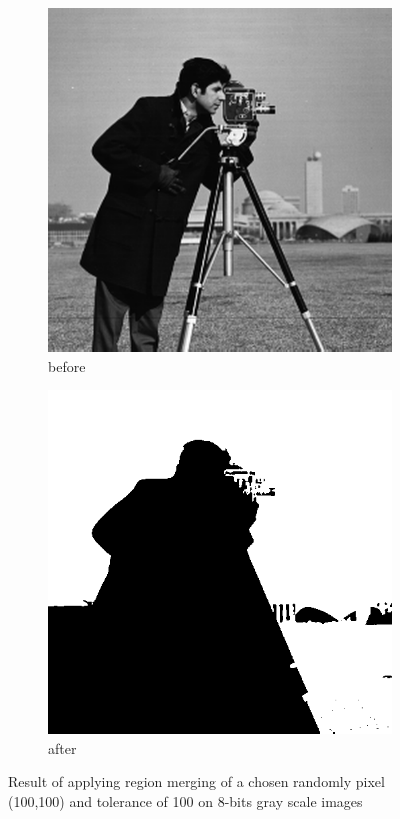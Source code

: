 \documentclass[12pt]{article}
\renewcommand{\subfiguresize}{.25\textwidth}
\begin{document}
\begin{figure}[H]
    \begin{subfigure}[t]{\subfiguresize}
        \includegraphics[width=\textwidth]{img/magda/camera.png}
        \caption{before}
    \end{subfigure}
    \hspace{2em}
    \begin{subfigure}[t]{\subfiguresize}
        \includegraphics[width=\textwidth]{img/magda/region_output2.png}
        \caption{after}
    \end{subfigure}
    \caption{Result of applying region merging of a chosen randomly pixel (100,100) and tolerance of 100 on 8-bits gray scale images}
\end{figure}
\end{document}
